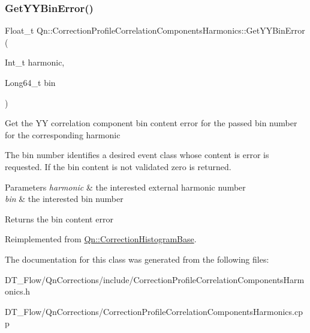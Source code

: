 \subsubsection{\texorpdfstring{Get\+Y\+Y\+Bin\+Error()}{GetYYBinError()}}
{\footnotesize\ttfamily Float\+\_\+t Qn\+::\+Correction\+Profile\+Correlation\+Components\+Harmonics\+::\+Get\+Y\+Y\+Bin\+Error (\begin{DoxyParamCaption}\item[{Int\+\_\+t}]{harmonic,  }\item[{Long64\+\_\+t}]{bin }\end{DoxyParamCaption})\hspace{0.3cm}{\ttfamily [virtual]}}

Get the YY correlation component bin content error for the passed bin number for the corresponding harmonic

The bin number identifies a desired event class whose content is error is requested. If the bin content is not validated zero is returned.


\begin{DoxyParams}{Parameters}
{\em harmonic} & the interested external harmonic number \\
\hline
{\em bin} & the interested bin number \\
\hline
\end{DoxyParams}
\begin{DoxyReturn}{Returns}
the bin content error 
\end{DoxyReturn}


Reimplemented from \mbox{\hyperlink{classQn_1_1CorrectionHistogramBase_a3ea1dbffee549c8cedb8926c34e46c77}{Qn\+::\+Correction\+Histogram\+Base}}.



The documentation for this class was generated from the following files\+:\begin{DoxyCompactItemize}
\item 
D\+T\+\_\+\+Flow/\+Qn\+Corrections/include/Correction\+Profile\+Correlation\+Components\+Harmonics.\+h\item 
D\+T\+\_\+\+Flow/\+Qn\+Corrections/Correction\+Profile\+Correlation\+Components\+Harmonics.\+cpp\end{DoxyCompactItemize}
